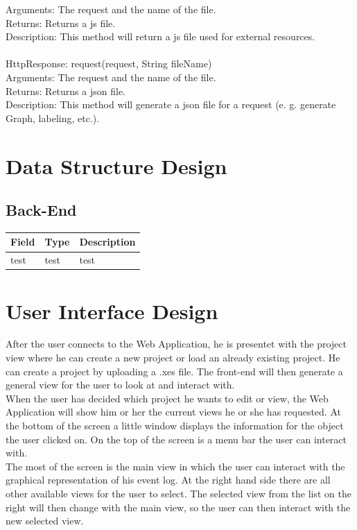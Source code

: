 \documentclass[12pt]{extarticle}
\begin{document}
    Arguments: The request and the name of the file. \\
	Returns: Returns a js file. \\
	Description: This method will return a js file used for external resources. \\ \\
	HttpResponse: request(request, String fileName) \\
    Arguments: The request and the name of the file. \\
	Returns: Returns a json file. \\
	Description: This method will generate a json file for a request (e. g. generate Graph, labeling, etc.). \\

\section{Data Structure Design}

\subsection{Back-End}

\begin{tabular}{ | l | l | l |}
    \hline
    Field & Type & Description \\ \hline
    test & test & test \\
    \hline
\end{tabular}

\section{User Interface Design}
After the user connects to the Web Application, he is presentet with the project view where he can create a new project or load an already existing project. He can create a project by uploading a .xes file. The front-end will then generate a general view for the user to look at and interact with. \\
When the user has decided which project he wants to edit or view, the Web Application will show him or her the current views he or she has requested. At the bottom of the screen a little window displays the information for the object the user clicked on. On the top of the screen is a menu bar the user can interact with. \\
The most of the screen is the main view in which the user can interact with the graphical representation of his event log. At the right hand side there are all other available views for the user to select. The selected view from the list on the right will then change with the main view, so the user can then interact with the new selected view.
\end{document}
